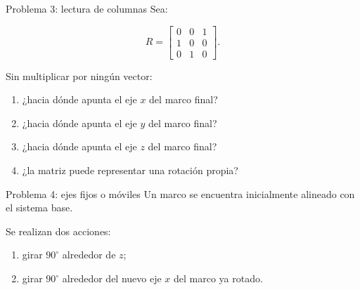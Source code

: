 \documentclass[aspectratio=169,10pt]{beamer}
\begin{document}
\begin{frame}{Problema 3: lectura de columnas}
    \small
    Sea:

    \[
    R=
    \begin{bmatrix}
        0&0&1\\
        1&0&0\\
        0&1&0
    \end{bmatrix}.
    \]

    Sin multiplicar por ningún vector:

    \begin{enumerate}
        \item ¿hacia dónde apunta el eje $x$ del marco final?
        \item ¿hacia dónde apunta el eje $y$ del marco final?
        \item ¿hacia dónde apunta el eje $z$ del marco final?
        \item ¿la matriz puede representar una rotación propia?
    \end{enumerate}

\end{frame}

\begin{frame}{Problema 4: ejes fijos o móviles}
    \small
    Un marco se encuentra inicialmente alineado con el sistema base.

    Se realizan dos acciones:

    \begin{enumerate}
        \item girar $90^\circ$ alrededor de $z$;
        \item girar $90^\circ$ alrededor del nuevo eje $x$ del marco ya rotado.
    \end{enumerate}

    \vspace{0.15cm}


\end{frame}
\end{document}
